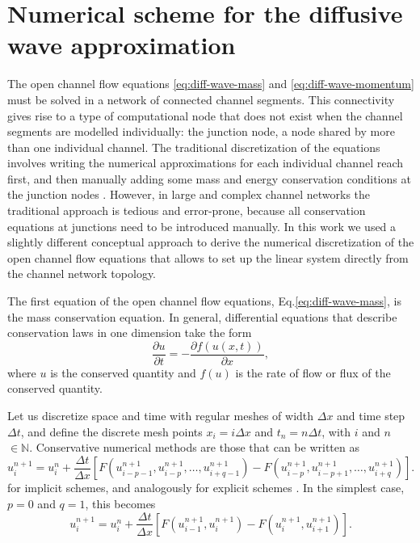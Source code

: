 \documentclass[bg, manuscript]{copernicus}
\begin{document}


\appendix
\section{Numerical scheme for the diffusive wave approximation} \label{ap-difwave}

The open channel flow equations \eqref{eq:diff-wave-mass} and \eqref{eq:diff-wave-momentum} must be solved in a  network of connected channel segments.
This connectivity gives rise to a  type of computational node that does not exist when the channel segments are modelled individually: the junction node, a node shared by more than one individual channel. 
The traditional discretization of the equations  involves writing the numerical approximations for each individual channel reach first, and then manually adding some mass and energy conservation conditions at the junction nodes \citep{cungePracticalAspectsComputational1980, szymkiewiczNumericalModelingOpen2010}.
However, in large and complex channel networks the traditional approach is tedious and error-prone, because all conservation equations at junctions need to   be introduced manually.
In this work we used a slightly different conceptual approach to derive the numerical discretization of the open channel flow equations that allows to set up the linear system directly from the channel network topology.

The first equation of the open channel flow equations, Eq.\eqref{eq:diff-wave-mass}, is the mass conservation equation.
In general, differential equations that describe conservation laws in one dimension take the form
\begin{equation} \label{eq:conservation_pde}
\frac{\partial u}{\partial t} =-\frac{\partial f(u(x,t))}{\partial x},
\end{equation}
where $u$ is the conserved quantity and $f(u)$ is the rate of flow or flux  of the conserved quantity.

Let us discretize space and time with regular meshes of width $\Delta x$ and time step $\Delta t$, and define the discrete mesh points $x_i=i\Delta x$ and $t_n=n\Delta t$, with $i$ and $n$ $\in \mathbb{N}$.
Conservative numerical methods are those that can be written as
\begin{equation} \label{eq:general-discretization-consesrvative-pde}
u_i^{n+1} = u_i^n + \frac{\Delta t}{\Delta x} \left[F(u^{n+1}_{i-p-1}, u^{n+1}_{i-p}, \dots, u^{n+1}_{i+q-1}) - F(u^{n+1}_{i-p}, u^{n+1}_{i-p+1}, \dots, u^{n+1}_{i+q})\right]. 
\end{equation}
for implicit schemes, and analogously for explicit schemes \citep{levequeNumericalMethodsConservation1992}.
In the simplest case, $p = 0$ and $q=1$, this becomes
\begin{equation} \label{eq:simplest-conservative-num-method}
u_i^{n+1} = u_i^n + \frac{\Delta t}{\Delta x} \left[F(u^{n+1}_{i-1}, u^{n+1}_{i}) - F(u^{n+1}_{i}, u^{n+1}_{i+1})\right].
\end{equation}
\end{document}
